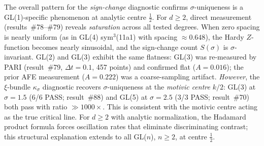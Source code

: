 \documentclass[11pt, a4paper]{article}
\theoremstyle{definition}
\theoremstyle{plain}
\begin{document}
The overall pattern for the \emph{sign-change} diagnostic confirms
$\sigma$-uniqueness is a GL(1)-specific phenomenon at analytic centre $\frac{1}{2}$.
For $d \geq 2$, direct measurement (results~\#78--\#79) reveals
\emph{saturation} across all tested degrees. When zero spacing is nearly uniform
(as in GL(4) sym$^3$(11a1) with spacing $\approx 0.648$), the Hardy $Z$-function
becomes nearly sinusoidal, and the sign-change count $S(\sigma)$ is $\sigma$-invariant.
GL(2) and GL(3) exhibit the same flatness: GL(3) was re-measured by PARI (result~\#79,
$\Delta t=0.1$, 457 points) and confirmed flat ($A=0.016$); the prior AFE measurement
($A=0.222$) was a coarse-sampling artifact.
\emph{However}, the $\xi$-bundle $\kappa_\sigma$ diagnostic recovers $\sigma$-uniqueness
at the \emph{motivic centre} $k/2$: GL(3) at $\sigma = 1.5$ (6/6 PASS; result~\#88)
and GL(5) at $\sigma = 2.5$ (3/3 PASS; result~\#70) both pass with ratio $\gg 1000\times$.
This is consistent with the motivic centre acting as the true critical line.
For $d \geq 2$ with analytic normalization, the Hadamard product formula forces
oscillation rates that eliminate discriminating contrast; this structural
explanation extends to all GL($n$), $n \geq 2$, at centre $\frac{1}{2}$.
\end{document}
